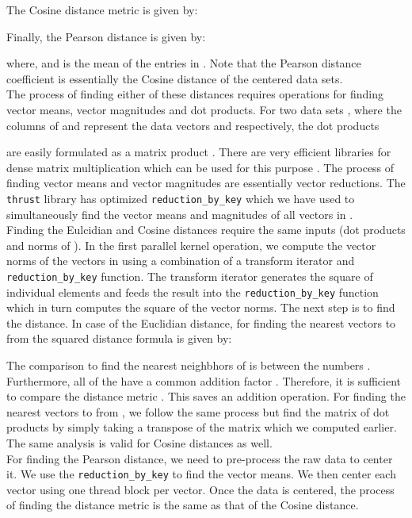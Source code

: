 \documentclass[10pt]{article}
\begin{document}
The Cosine distance metric is given by: 

Finally, the Pearson distance is given by:

where,  and  is the mean of the entries in . Note that the Pearson distance coefficient is essentially the Cosine distance of the centered data sets.\\

The process of finding either of these distances requires operations for finding vector means, vector magnitudes and dot products. For two data sets , where the columns of  and  represent the data vectors  and  respectively, the  dot products 

are easily formulated as a matrix product . There are very efficient libraries for dense matrix multiplication which can be used for this purpose \cite{Volkov:2008}. The process of finding vector means and vector magnitudes are essentially vector reductions. The \texttt{thrust} library has optimized \texttt{reduction\_by\_key} which we have used to simultaneously find the vector means and magnitudes of all vectors in .\\

Finding the Eulcidian and Cosine distances require the same inputs (dot products and norms of ). In the first parallel kernel operation, we compute the vector norms of the vectors in  using a combination of a transform iterator and \texttt{reduction\_by\_key} function. The transform iterator generates the square of individual elements and feeds the result into the \texttt{reduction\_by\_key} function which in turn computes the square of the vector norms.  The next step is to find the distance. In case of the Euclidian distance,  for finding the  nearest vectors to  from  the squared distance formula is given by:
 
The comparison to find the  nearest neighbhors of  is between the numbers . Furthermore, all of the  have a common addition factor . Therefore, it is sufficient to compare the distance metric . This saves an addition operation. For finding the  nearest vectors to  from ,  we follow the same process but find the matrix of dot products  by simply taking a transpose of the matrix  which we computed earlier. The same analysis is valid for Cosine distances as well.\\

For finding the Pearson distance, we need to pre-process the raw data to center it. We use the \texttt{reduction\_by\_key} to find the vector means.  We then center each vector using one thread block per vector. Once the data is centered, the process of finding the distance metric is the same as that of the Cosine distance. \\
\end{document}
